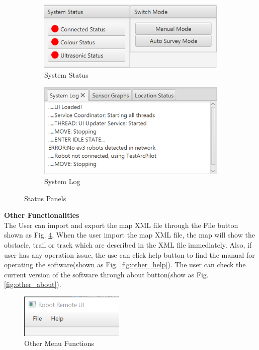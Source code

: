 \begin{figure}[H]
	\centering
	\begin{subfigure}[t]{0.5\textwidth}
		\includegraphics[width=0.95\linewidth]{Systemstatus.png}  
		\caption{System Status}
		\label{fig:panelStatus}                
	\end{subfigure}
	\begin{subfigure}[t]{0.45\textwidth}
		\includegraphics[width=0.95\linewidth]{SystemLog.png}  
		\caption{System Log}
		\label{fig:panelLog}
	\end{subfigure}
	\caption{Status Panels}
\end{figure}

\textbf{Other Functionalities}\\
The User can import and export the map XML file through the File button shown as Fig. \ref{fig:other topmenu}. When the user import the map XML file, the map will show the obstacle, trail or track which are described in the XML file immediately. Also, if user has any operation issue, the use can click help button to find the manual for operating the software(shown as Fig. \ref{fig:other_help}). The user can check the current version of the software through about button(show as Fig.\ref{fig:other_about}).

\begin{figure}[H]
	\centering
	\includegraphics[width=50mm]{other.png}  
	\caption{Other Menu Functions}
	\label{fig:other topmenu}                
\end{figure}


